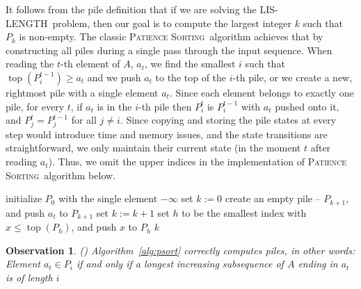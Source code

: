 \documentclass[lic, english, shortabstract]{iithesis}
\theoremstyle{plain}
\newcommand{\LisLen}{\textsc{LIS-LENGTH}}
\newcommand{\Psort}{\textsc{Patience Sorting}}
\newtheorem{observation}[theorem]{Observation}
\theoremstyle{definition}
\begin{document}
It follows from the pile definition that if we are solving the \LisLen\ problem, then our goal is to compute the largest integer $k$ such that $P_k$ is non-empty.
The classic \Psort\ algorithm achieves that by constructing all piles during a single pass through the input sequence. When reading the $t$-th element of $A$, $a_t$, we find
the smallest $i$ such that $\operatorname{top}(P_i^{t-1}) \geq a_t$ and we push $a_t$ to the top of the $i$-th pile, or we create a new, rightmost pile with a single element $a_t$.
Since each element belongs to exactly one pile, for every $t$, if $a_t$ is in the $i$-th pile then $P_i^t$ is $P_i^{t-1}$ with $a_t$ pushed onto it, and $P_j^t = P_j^{t-1}$ for all $j \neq i$.
Since copying and storing the pile states at every step would introduce time and memory issues, and the state transitions are straightforward, we only maintain their current state (in the moment $t$ after reading $a_t$).
Thus, we omit the upper indices in the implementation of \Psort\ algorithm below.

\begin{algorithm}
    \caption{\Psort}
    \label{alg:psort}
    \begin{algorithmic}[1]
        \State initialize $P_{0}$ with the single element $-\infty$
        \State set $k := 0$ \Comment{\textcolor{gray}{$k$ will be the index of the rightmost non-empty pile}}
                \State create an empty pile -- $P_{k+1}$, and push $a_t$ to $P_{k+1}$
                \State set $k := k + 1$
            \Else
                \State set $h$ to be the smallest index with $x \leq \operatorname{top}(P_h)$, and push $x$ to $P_h$
            \EndIf
        \EndFor
        \State \Return $k$
  \end{algorithmic}
\end{algorithm}


\begin{observation}\label{obs:pile}(\cite{burnstein})
Algorithm~\ref{alg:psort} correctly computes piles, in other words: \\
Element $a_t \in P_i$ if and only if a \textit{longest increasing subsequence} of $A$ ending in $a_t$ is of length $i$
\end{observation}


\end{document}
